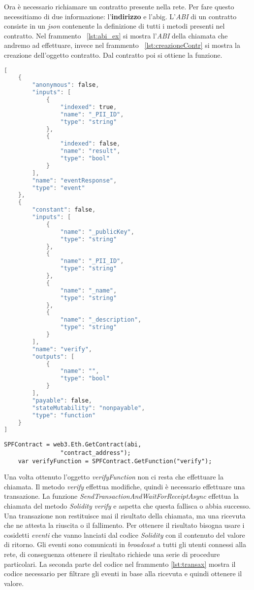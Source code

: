 Ora è necessario richiamare un contratto presente nella rete. Per fare questo necessitiamo di due informazione: l'\textbf{indirizzo} e l'\gls{abig}\glsfirstoccur. L'\emph{ABI} di un contratto consiste in un \emph{json} contenente la definizione di tutti i metodi presenti nel contratto. Nel frammento ~\ref{lst:abi_ex} si mostra l'\emph{ABI} della chiamata che andremo ad effettuare, invece nel frammento ~\ref{lst:creazioneContr} si mostra la creazione dell'oggetto contratto. Dal contratto poi si ottiene la funzione.

\begin{lstlisting}[caption={Esempio di ABI},label={lst:abi_ex},language={C}]
[
    {
        "anonymous": false,
        "inputs": [
            {
                "indexed": true,
                "name": "_PII_ID",
                "type": "string"
            },
            {
                "indexed": false,
                "name": "result",
                "type": "bool"
            }
        ],
        "name": "eventResponse",
        "type": "event"
    },
    {
        "constant": false,
        "inputs": [
            {
                "name": "_publicKey",
                "type": "string"
            },
            {
                "name": "_PII_ID",
                "type": "string"
            },
            {
                "name": "_name",
                "type": "string"
            },
            {
                "name": "_description",
                "type": "string"
            }
        ],
        "name": "verify",
        "outputs": [
            {
                "name": "",
                "type": "bool"
            }
        ],
        "payable": false,
        "stateMutability": "nonpayable",
        "type": "function"
    }
]  
\end{lstlisting}

\begin{lstlisting}[caption={Creazione del contratto},label={lst:creazioneContr},language={[Sharp]C}]
    SPFContract = web3.Eth.GetContract(abi,
                "contract_address");
    var verifyFunction = SPFContract.GetFunction("verify");
\end{lstlisting}

Una volta ottenuto l'oggetto \emph{verifyFunction} non ci resta che effettuare la chiamata. Il metodo \emph{verify} effettua modifiche, quindi è necessario effettuare una transazione. La funzione \emph{SendTransactionAndWaitForReceiptAsync} effettua la chiamata del metodo \emph{Solidity} \emph{verify} e aspetta che questa fallisca o abbia successo. Una transazione non restituisce mai il risultato della chiamata, ma una ricevuta che ne attesta la riuscita o il fallimento. Per ottenere il risultato bisogna usare i cosidetti \emph{eventi} che vanno lanciati dal codice \emph{Solidity} con il contenuto del valore di ritorno. Gli eventi sono comunicati in \emph{broadcast} a tutti gli utenti connessi alla rete, di conseguenza ottenere il risultato richiede una serie di procedure particolari. La seconda parte del codice nel frammento \ref{lst:transax} mostra il codice necessario per filtrare gli eventi in base alla ricevuta e quindi ottenere il valore. 


